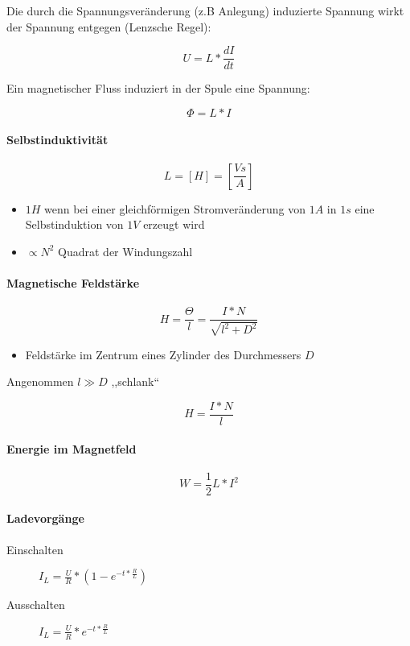 Die durch die Spannungsveränderung (z.B Anlegung) induzierte Spannung wirkt der Spannung entgegen (Lenzsche Regel):

$$U = L * \frac{dI}{dt}$$

Ein magnetischer Fluss induziert in der Spule eine Spannung:

$$\Phi = L * I$$

\paragraph{Selbstinduktivität}

$$L = [H] = \left[\frac{Vs}{A}\right]$$

\begin{itemize}
  \item $1H$ wenn bei einer gleichförmigen Stromveränderung von $1A$ in $1s$ eine Selbstinduktion von $1V$ erzeugt wird
  \item $\propto N^2$ Quadrat der Windungszahl
\end{itemize}

\paragraph{Magnetische Feldstärke}

$$H = \frac{\Theta}{l} = \frac{I * N}{\sqrt{l^2 + D^2}}$$

\begin{itemize}
  \item Feldstärke im Zentrum eines Zylinder des Durchmessers $D$
\end{itemize}

Angenommen $l \gg D$ ,,schlank``

$$H = \frac{I * N}{l}$$

\paragraph{Energie im Magnetfeld}

$$W = \frac{1}{2} L * I^2$$

\paragraph{Ladevorgänge}

\begin{description}
  \item[Einschalten] $I_L = \frac{U}{R} * (1 - e^{-t * \frac{R}{L}})$
  \item[Ausschalten] $I_L = \frac{U}{R} * e^{-t * \frac{R}{L}}$
\end{description}

